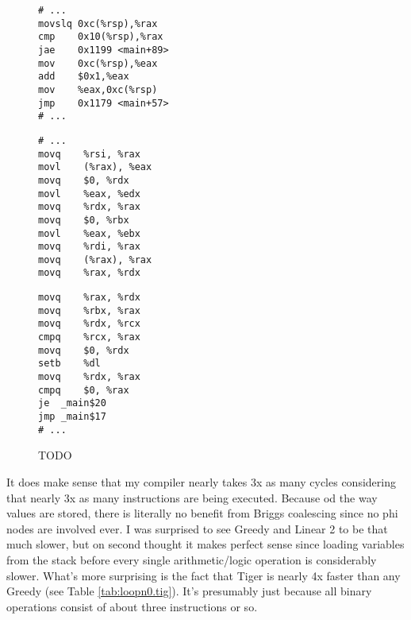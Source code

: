 \documentclass{article}
\begin{document}
\begin{figure}[H]
     \centering
     \begin{minipage}[b]{0.32\textwidth}
\begin{verbatim}
# ...
movslq 0xc(%rsp),%rax
cmp    0x10(%rsp),%rax
jae    0x1199 <main+89>
mov    0xc(%rsp),%eax
add    $0x1,%eax
mov    %eax,0xc(%rsp)
jmp    0x1179 <main+57>
# ...
     \end{verbatim}
     \caption{TODO}\label{fig:clang-loop}
   \end{minipage}
   \begin{minipage}[b]{0.65\textwidth}
   \begin{minipage}[b]{0.50\textwidth}
  \begin{verbatim}
# ...
movq	%rsi, %rax
movl	(%rax), %eax
movq	$0, %rdx
movl	%eax, %edx
movq	%rdx, %rax
movq	$0, %rbx
movl	%eax, %ebx
movq	%rdi, %rax
movq	(%rax), %rax
movq	%rax, %rdx
     \end{verbatim}
   \end{minipage}
   \begin{minipage}[b]{0.50\textwidth}
  \begin{verbatim}
movq	%rax, %rdx
movq	%rbx, %rax
movq	%rdx, %rcx
cmpq	%rcx, %rax
movq	$0, %rdx
setb	%dl
movq	%rdx, %rax
cmpq	$0, %rax
je	_main$20
jmp	_main$17
# ...
     \end{verbatim}
   \end{minipage}
     \caption{TODO}\label{fig:my-loop0}
   \end{minipage}
\end{figure}
\noindent It does make sense that my compiler nearly takes 3x as many cycles considering that nearly 3x as many instructions are being executed.   Because od the way values are stored, there is literally no benefit from Briggs coalescing since no phi nodes are involved ever.
I was surprised to see Greedy and Linear 2 to be that much slower, but on second thought it makes perfect sense since loading variables from the stack before every single arithmetic/logic operation is considerably slower. What's more surprising is the fact that Tiger is nearly 4x faster than any Greedy (see Table \ref{tab:loopn0.tig}).
It's presumably just because all binary operations consist of  about three instructions or so.
\end{document}
